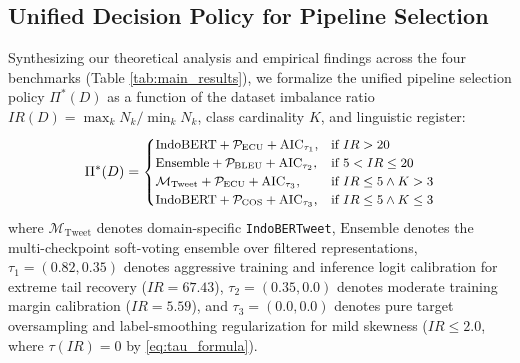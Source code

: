\documentclass{ieeeaccess}
\begin{document}
\subsection{Unified Decision Policy for Pipeline Selection}
\label{subsec:decision_rule}

Synthesizing our theoretical analysis and empirical findings across the four benchmarks (Table \ref{tab:main_results}), we formalize the unified pipeline selection policy $\Pi^*(D)$ as a function of the dataset imbalance ratio $IR(D) = \max_k N_k / \min_k N_k$, class cardinality $K$, and linguistic register:
\begin{equation}
\label{eq:decision_policy}
\small
\Pi^*(D) = \begin{cases}
\text{IndoBERT} + \mathcal{P}_{\text{ECU}} + \text{AIC}_{\tau_1}, & \text{if } IR > 20 \\
\text{Ensemble} + \mathcal{P}_{\text{BLEU}} + \text{AIC}_{\tau_2}, & \text{if } 5 < IR \le 20 \\
\mathcal{M}_{\text{Tweet}} + \mathcal{P}_{\text{ECU}} + \text{AIC}_{\tau_3}, & \text{if } IR \le 5 \land K > 3 \\
\text{IndoBERT} + \mathcal{P}_{\text{COS}} + \text{AIC}_{\tau_3}, & \text{if } IR \le 5 \land K \le 3
\end{cases}
\end{equation}
where $\mathcal{M}_{\text{Tweet}}$ denotes domain-specific \texttt{IndoBERTweet}, $\text{Ensemble}$ denotes the multi-checkpoint soft-voting ensemble over filtered representations, $\tau_1 = (0.82, 0.35)$ denotes aggressive training and inference logit calibration for extreme tail recovery ($IR = 67.43$), $\tau_2 = (0.35, 0.0)$ denotes moderate training margin calibration ($IR = 5.59$), and $\tau_3 = (0.0, 0.0)$ denotes pure target oversampling and label-smoothing regularization for mild skewness ($IR \le 2.0$, where $\tau(IR) = 0$ by \eqref{eq:tau_formula}).
\end{document}
